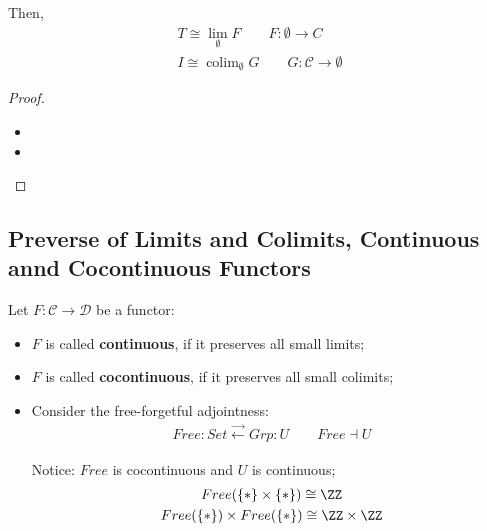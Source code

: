 \documentclass[Total.tex]{subfiles}
\begin{document}
					\begin{proposition}
						Then,
						\begin{gather*}
							T\cong \lim_\emptyset F\qquad F:\emptyset\rightarrow C\\
							I\cong \operatorname{colim}_\emptyset  G\qquad G:\mathcal{C}\rightarrow \emptyset
						\end{gather*}
					\end{proposition}
					\begin{proof}
						\begin{itemize}
							\item 
							\item 
						\end{itemize}
					\end{proof}
			\subsection{Preverse of Limits and Colimits, Continuous annd Cocontinuous Functors}
			\begin{Def} Let $F:\mathcal{C}\rightarrow \mathcal{D}$ be a functor:
				\begin{itemize}
					\item $F$ is called \textbf{continuous}, if it preserves all small limits;
					\item $F$ is called \textbf{cocontinuous}, if it preserves all small colimits;
				\end{itemize}
			\end{Def}
			
			\begin{example}
				\begin{itemize}
					\item Consider the free-forgetful adjointness:
					\begin{gather*}
						Free:Set\stackrel{\rightarrow}{\leftarrow} Grp:U\qquad Free\dashv U
					\end{gather*}
					
					Notice: $Free$ is cocontinuous and $U$ is continuous;
					\begin{gather*}
						Free(\{*\}\times \{*\})\cong \ZZ\\
						Free(\{*\})\times Free(\{*\})\cong \ZZ\times \ZZ
					\end{gather*}
				\end{itemize}
			\end{example}
			
\end{document}
